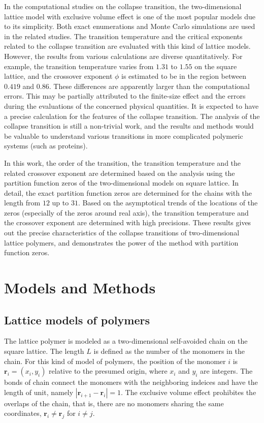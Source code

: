 \documentclass[preprint,preprintnumbers,amsmath,amssymb,showpacs,aps,pre]{revtex4-1}
\begin{document}
In the computational studies on the collapse transition, the
two-dimensional lattice model with exclusive volume effect is
one of the most popular models due to its simplicity. Both exact
enumerations and Monte Carlo simulations are used in the related
studies\cite{SaleurJSP86,DuplantierPRL87,StanleyPRB89,OYJCP08,
DerridaJPA85,SenoJP88,ChangPRE93,HeegerJP95,MurthyPRE01}. The
transition temperature and the critical exponents related to the
collapse transition are evaluated with this kind of lattice models.
However, the results from various calculations are diverse
quantitatively. For example, the transition temperature varies from
$1.31$ to $1.55$ on the square lattice, and the crossover exponent
$\phi$ is estimated to be in the region between $0.419$ and $0.86$.
These differences are apparently larger than the computational
errors. This may be partially attributed to the finite-size effect
and the errors during the evaluations of the concerned physical
quantities. It is expected to have a precise calculation for the
features of the collapse transition. The analysis of the collapse
transition is still a non-trivial work, and the results and methods
would be valuable to understand various transitions in more
complicated polymeric systems (such as proteins\cite{ZivPCCP09}).

In this work, the order of the transition, the transition temperature
and the related crossover exponent are determined based on the analysis
using the partition function zeros of the two-dimensional models
on square lattice. In detail, the exact partition function zeros are
determined for the chains with the length from $12$ up to $31$. Based
on the asymptotical trends of the locations of the zeros (especially
of the zeros around real axis), the transition temperature and the
crossover exponent are determined with high precisions. These results
gives out the precise characteristics of the collapse transitions of
two-dimensional lattice polymers, and demonstrates the power of the
method with partition function zeros.

\section{Models and Methods}

\subsection{Lattice models of polymers}

The lattice polymer is modeled as a two-dimensional self-avoided chain
on the square lattice. The length $L$ is defined as the number of the
monomers in the chain. For this kind of model of polymers, the position
of the monomer $i$ is ${\mathbf r}_i=(x_i,y_i)$ relative to the presumed
origin, where $x_i$ and $y_i$ are integers. The bonds of chain connect
the monomers with the neighboring indeices and have the length of unit,
namely $|{\mathbf r}_{i+1}-{\mathbf r}_i|=1$. The exclusive volume effect
prohibites the overlaps of the chain, that is, there are no monomers sharing
the same coordinates, ${\mathbf r}_i\neq {\mathbf r}_j$ for $i\neq j$. 
\end{document}
